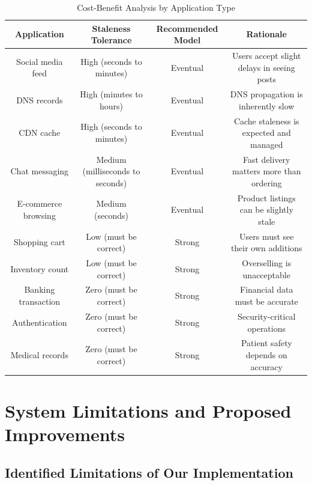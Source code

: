 \documentclass[10pt,a4paper]{article}
\begin{document}
\begin{table}[H]
\centering
\caption{Cost-Benefit Analysis by Application Type}
\begin{tabular}{|c|c|c|c|}
\hline
\textbf{Application} & \textbf{Staleness Tolerance} & \textbf{Recommended Model} & \textbf{Rationale} \\
\hline
Social media feed & High (seconds to minutes) & Eventual & Users accept slight delays in seeing posts \\
\hline
DNS records & High (minutes to hours) & Eventual & DNS propagation is inherently slow \\
\hline
CDN cache & High (seconds to minutes) & Eventual & Cache staleness is expected and managed \\
\hline
Chat messaging & Medium (milliseconds to seconds) & Eventual & Fast delivery matters more than ordering \\
\hline
E-commerce browsing & Medium (seconds) & Eventual & Product listings can be slightly stale \\
\hline
Shopping cart & Low (must be correct) & Strong & Users must see their own additions \\
\hline
Inventory count & Low (must be correct) & Strong & Overselling is unacceptable \\
\hline
Banking transaction & Zero (must be correct) & Strong & Financial data must be accurate \\
\hline
Authentication & Zero (must be correct) & Strong & Security-critical operations \\
\hline
Medical records & Zero (must be correct) & Strong & Patient safety depends on accuracy \\
\hline
\end{tabular}
\end{table}

\newpage

\section{System Limitations and Proposed Improvements}

\subsection{Identified Limitations of Our Implementation}
\end{document}
